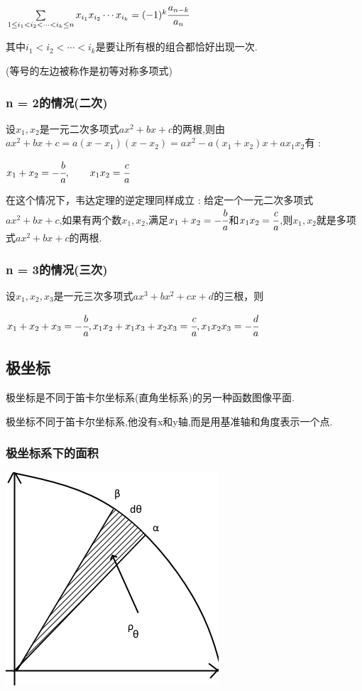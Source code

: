 \documentclass[UTF8,12pt]{ctexbook}
\begin{document}
{{{{$\sum\limits_{1 \leq i_1 < i_2 < \dotsm < i_k \leq n}x_{i_{1}}x_{i_{2}} \dotsm x_{i_{k}} = (-1)^k\cfrac{a_{n-k}}{a_n}$

其中$i_1 < i_2 < \dotsm < i_k$是要让所有根的组合都恰好出现一次.

(等号的左边被称作是初等对称多项式)
}%

\subsubsection{n = 2的情况(二次)}{
  设$x_1,x_2$是一元二次多项式$ax^2 + bx + c$的两根,则由$ax^2 +bx + c = a(x - x_1)(x - x_2) = ax^2 - a(x_1 + x_2)x + ax_1x_2$有 :

  $x_1 + x_2 = -\cfrac{b}{a},\qquad x_1x_2 = \cfrac{c}{a}$

  在这个情况下，韦达定理的逆定理同样成立 : 给定一个一元二次多项式$ax^2 + bx + c$,如果有两个数$x_1,x_2$,满足$x_1 + x_2 = -\cfrac{b}{a}$和$x_1x_2 = \cfrac{c}{a}$,则$x_1,x_2$就是多项式$ax^2 + bx + c$的两根.
}%

\subsubsection{n = 3的情况(三次)}{
  设$x_1,x_2,x_3$是一元三次多项式$ax^3 + bx^2 + cx + d$的三根，则

  $x_1 + x_2 + x_3 = -\cfrac{b}{a}, x_1x_2 + x_1x_3 + x_2x_3 = \cfrac{c}{a},x_1x_2x_3 = -\cfrac{d}{a}$
}%

}%

\subsection{极坐标}{
极坐标是不同于笛卡尔坐标系(直角坐标系)的另一种函数图像平面.

极坐标不同于笛卡尔坐标系,他没有x和y轴,而是用基准轴和角度表示一个点.

\subsubsection{极坐标系下的面积}{
  \begin{center}
    \includegraphics{resources/polar_coordness.png}
  \end{center}

}}}}
\end{document}
